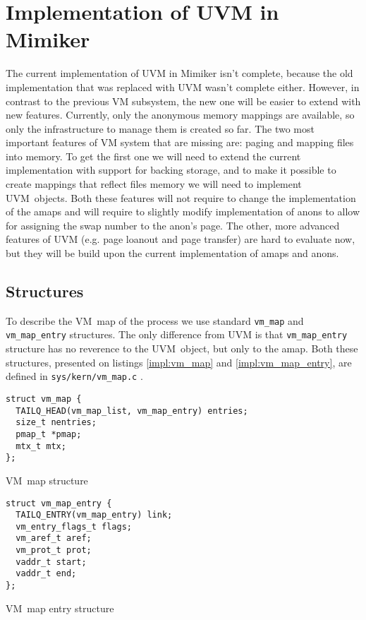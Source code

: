 \section{Implementation of UVM in Mimiker}

The current implementation of UVM in Mimiker isn't complete, because the old implementation that was replaced with UVM wasn't complete either.
However, in contrast to the previous VM subsystem, the new one will be easier to extend with new features.
Currently, only the anonymous memory mappings are available, so only the infrastructure to manage them is created so far.
The two most important features of VM system that are missing are: paging and mapping files into memory.
To get the first one we will need to extend the current implementation with support for backing storage, and to make it possible
to create mappings that reflect files memory we will need to implement UVM~objects.
Both these features will not require to change the implementation of the amaps and will require to slightly modify implementation of
anons to allow for assigning the swap number to the anon's page.
The other, more advanced features of UVM (e.g. page loanout and page transfer) are hard to evaluate now,
but they will be build upon the current implementation of amaps and anons.

\subsection{Structures}

To describe the VM~map of the process we use standard \texttt{vm_map} and \texttt{vm_map_entry} structures.
The only difference from UVM is that \texttt{vm_map_entry} structure has no reverence to the UVM~object, but only to the amap.
Both these structures, presented on listings \ref{impl:vm_map} and \ref{impl:vm_map_entry}, are defined in \texttt{sys/kern/vm_map.c} \cite{mimiker:sources}.

\begin{listing}[h]
  \begin{verbatim}
struct vm_map {
  TAILQ_HEAD(vm_map_list, vm_map_entry) entries;
  size_t nentries;
  pmap_t *pmap;
  mtx_t mtx;
};
  \end{verbatim}
  \caption{VM~map structure}
  \label{impl:vm_map}
\end{listing}

\begin{listing}[h]
  \begin{verbatim}
struct vm_map_entry {
  TAILQ_ENTRY(vm_map_entry) link;
  vm_entry_flags_t flags;
  vm_aref_t aref;
  vm_prot_t prot;
  vaddr_t start;
  vaddr_t end;
};
  \end{verbatim}
  \caption{VM~map entry structure}
  \label{impl:vm_map_entry}
\end{listing}

